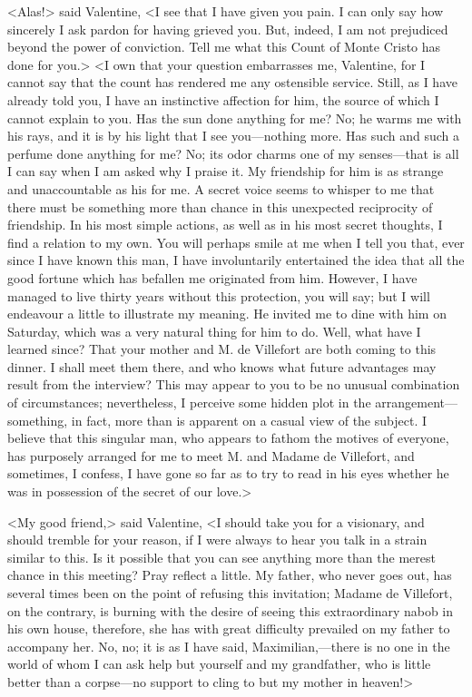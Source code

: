  <Alas!> said Valentine, <I see that I have given you pain. I can only say how sincerely I ask pardon for having grieved you. But, indeed, I am not prejudiced beyond the power of conviction. Tell me what this Count of Monte Cristo has done for you.>  <I own that your question embarrasses me, Valentine, for I cannot say that the count has rendered me any ostensible service. Still, as I have already told you, I have an instinctive affection for him, the source of which I cannot explain to you. Has the sun done anything for me? No; he warms me with his rays, and it is by his light that I see you—nothing more. Has such and such a perfume done anything for me? No; its odor charms one of my senses—that is all I can say when I am asked why I praise it. My friendship for him is as strange and unaccountable as his for me. A secret voice seems to whisper to me that there must be something more than chance in this unexpected reciprocity of friendship. In his most simple actions, as well as in his most secret thoughts, I find a relation to my own. You will perhaps smile at me when I tell you that, ever since I have known this man, I have involuntarily entertained the idea that all the good fortune which has befallen me originated from him. However, I have managed to live thirty years without this protection, you will say; but I will endeavour a little to illustrate my meaning. He invited me to dine with him on Saturday, which was a very natural thing for him to do. Well, what have I learned since? That your mother and M. de Villefort are both coming to this dinner. I shall meet them there, and who knows what future advantages may result from the interview? This may appear to you to be no unusual combination of circumstances; nevertheless, I perceive some hidden plot in the arrangement—something, in fact, more than is apparent on a casual view of the subject. I believe that this singular man, who appears to fathom the motives of everyone, has purposely arranged for me to meet M. and Madame de Villefort, and sometimes, I confess, I have gone so far as to try to read in his eyes whether he was in possession of the secret of our love.> 

 <My good friend,> said Valentine, <I should take you for a visionary, and should tremble for your reason, if I were always to hear you talk in a strain similar to this. Is it possible that you can see anything more than the merest chance in this meeting? Pray reflect a little. My father, who never goes out, has several times been on the point of refusing this invitation; Madame de Villefort, on the contrary, is burning with the desire of seeing this extraordinary nabob in his own house, therefore, she has with great difficulty prevailed on my father to accompany her. No, no; it is as I have said, Maximilian,—there is no one in the world of whom I can ask help but yourself and my grandfather, who is little better than a corpse—no support to cling to but my mother in heaven!> 

